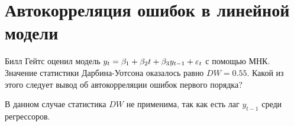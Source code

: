 

\chapter{Автокорреляция ошибок в линейной модели}

\begin{problem}
Билл Гейтс оценил модель $y_t=\beta_1 + \beta_2 t + \beta_3 y_{t-1} + \varepsilon_t$ с помощью МНК. Значение статистики Дарбина-Уотсона оказалось равно $DW=0.55$. Какой из этого следует вывод об автокорреляции ошибок первого порядка?

\begin{sol}
В данном случае статистика $DW$ не применима, так как есть лаг $y_{t-1}$ среди регрессоров.
\end{sol}
\end{problem}


